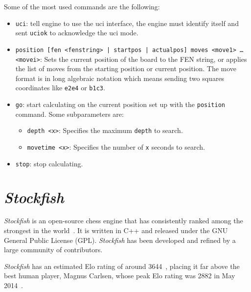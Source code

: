 \vspace{1em}

\noindent Some of the most used commands are the following:

\begin{itemize}[itemsep=1pt]

    \item \texttt{uci}: tell engine to use the uci interface, the engine must identify itself and sent \texttt{uciok} to acknowledge the uci mode.
    \item \texttt{position [fen <fenstring> | startpos | actualpos] moves <move1> \ldots \\<movei>}: Sets the current position of the board to the FEN string, or applies the list of moves from the starting position or current position. The move format is in long algebraic notation which means sending two squares coordinates like \texttt{e2e4} or \texttt{b1c3}.

    \item \texttt{go}: start calculating on the current position set up with the \texttt{position} command. Some  subparameters are:
    \begin{itemize}[itemsep=1pt]
        \item \texttt{depth <x>}: Specifies the maximum \texttt{depth} to search.
        \item \texttt{movetime <x>}: Specifies the number of \texttt{x} seconds to search. 
    \end{itemize}

    \item \texttt{stop}: stop calculating.
\end{itemize}

\newpage

\section{\textit{Stockfish}}
\label{sec:stockfish}

\par \textit{Stockfish} is an open-source chess engine that has consistently ranked among the strongest in the world~\cite{Stockfish}. It is written in C++ and released under the GNU General Public License (GPL). \textit{Stockfish} has been developed and refined by a large community of contributors.

\vspace{1em}

\par \textit{Stockfish} has an estimated Elo rating of around 3644~\cite{StockfishElo}, placing it far above the best human player, Magnus Carlsen, whose peak Elo rating was 2882 in May 2014~\cite{MagnusCarlsenElo}.

